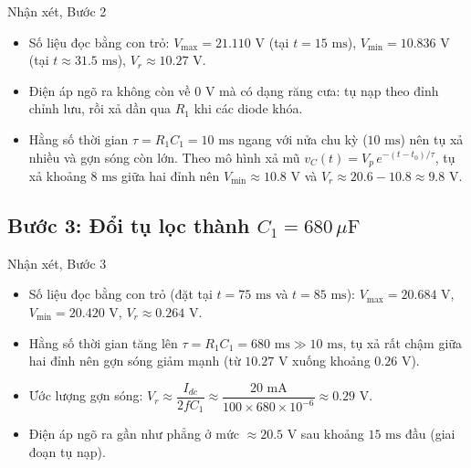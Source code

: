\begin{notebox}{Nhận xét, Bước 2}
  \begin{itemize}[leftmargin=1.5em,itemsep=2pt,topsep=2pt]
    \item Số liệu đọc bằng con trỏ: $V_{\max} = 21.110\text{ V}$ (tại $t = 15\text{ ms}$), $V_{\min} = 10.836\text{ V}$ (tại $t \approx 31.5\text{ ms}$), $V_r \approx 10.27\text{ V}$.
    \item Điện áp ngõ ra không còn về $0\text{ V}$ mà có dạng răng cưa: tụ nạp theo đỉnh chỉnh lưu, rồi xả dần qua $R_1$ khi các diode khóa.
    \item Hằng số thời gian $\tau = R_1 C_1 = 10\text{ ms}$ ngang với nửa chu kỳ ($10\text{ ms}$) nên tụ xả nhiều và gợn sóng còn lớn. Theo mô hình xả mũ $v_C(t) = V_p\,e^{-(t-t_0)/\tau}$, tụ xả khoảng $8\text{ ms}$ giữa hai đỉnh nên $V_{\min} \approx 10.8\text{ V}$ và $V_r \approx 20.6 - 10.8 \approx 9.8\text{ V}$.
  \end{itemize}
\end{notebox}

\Needspace{0.62\textheight}
\subsection{Bước 3: Đổi tụ lọc thành \texorpdfstring{$C_1 = 680\,\mu\text{F}$}{C1 = 680uF}}
\simresult
{}

\begin{notebox}{Nhận xét, Bước 3}
  \begin{itemize}[leftmargin=1.5em,itemsep=2pt,topsep=2pt]
    \item Số liệu đọc bằng con trỏ (đặt tại $t = 75\text{ ms}$ và $t = 85\text{ ms}$): $V_{\max} = 20.684\text{ V}$, $V_{\min} = 20.420\text{ V}$, $V_r \approx 0.264\text{ V}$.
    \item Hằng số thời gian tăng lên $\tau = R_1 C_1 = 680\text{ ms} \gg 10\text{ ms}$, tụ xả rất chậm giữa hai đỉnh nên gợn sóng giảm mạnh (từ $10.27\text{ V}$ xuống khoảng $0.26\text{ V}$).
    \item Ước lượng gợn sóng: $V_r \approx \dfrac{I_{dc}}{2fC_1} \approx \dfrac{20\text{ mA}}{100 \times 680 \times 10^{-6}} \approx 0.29\text{ V}$.
    \item Điện áp ngõ ra gần như phẳng ở mức $\approx 20.5\text{ V}$ sau khoảng $15\text{ ms}$ đầu (giai đoạn tụ nạp).
  \end{itemize}
\end{notebox}


